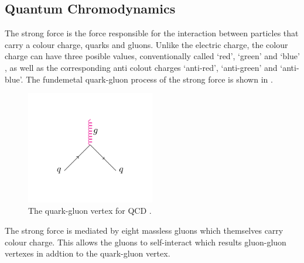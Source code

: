 \subsection{Quantum Chromodynamics}
\label{sec:QCD}
The strong force is the force responsible for the interaction between particles
that carry a colour charge, quarks and gluons. Unlike the electric charge, the
colour charge can have three posible values, conventionally called `red',
`green' and `blue' , as well as the corresponding anti colout charges
`anti-red', `anti-green' and `anti-blue'.
The fundemetal quark-gluon process of the strong force is shown in
.
\begin{figure}[htbp]
  \centering
  \includegraphics[width=0.5\textwidth]{qcd_process}
  \caption{The quark-gluon vertex for {QCD} .}
  \label{fig:qcdquark}
\end{figure}
The strong force is mediated by eight massless gluons which themselves carry
colour charge. This allows the gluons to self-interact which results gluon-gluon
vertexes in addtion to the quark-gluon vertex.

